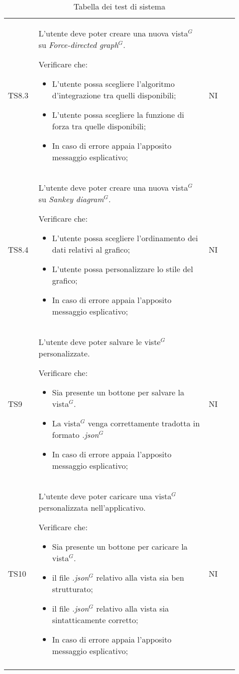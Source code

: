\begin{longtable}{p{0.12\linewidth}p{0.68\linewidth}p{0.12\linewidth}}
    \rowcolor[RGB]{233, 245, 206}
    TS8.3 &
    L'utente deve poter creare una nuova vista$^{G}$ su \textit{Force-directed graph}$^{G}$. \par
    Verificare che:
    \begin{itemize}
        \item L'utente possa scegliere l'algoritmo d'integrazione tra quelli disponibili;
        \item L'utente possa scegliere la funzione di forza tra quelle disponibili;
        \item In caso di errore appaia l’apposito messaggio esplicativo;
    \end{itemize}&
    NI \\

    \rowcolor[RGB]{216, 235, 171}
    TS8.4 &
    L'utente deve poter creare una nuova vista$^{G}$ su \textit{Sankey diagram}$^{G}$. \par
    Verificare che:
    \begin{itemize}
        \item L'utente possa scegliere l'ordinamento dei dati relativi al grafico;
        \item L'utente possa personalizzare lo stile del grafico;
        \item In caso di errore appaia l'apposito messaggio esplicativo;
    \end{itemize}&
    NI \\

    \rowcolor[RGB]{233, 245, 206}
    TS9 &
    L'utente deve poter salvare le viste$^{G}$ personalizzate. \par
    Verificare che:
    \begin{itemize}
        \item Sia presente un bottone per salvare la vista$^{G}$.
        \item La vista$^{G}$ venga correttamente tradotta in formato \textit{.json}$^{G}$
        \item In caso di errore appaia l'apposito messaggio esplicativo;
    \end{itemize}&
    NI \\

    \rowcolor[RGB]{216, 235, 171}
    TS10 &
    L'utente deve poter caricare una vista$^{G}$ personalizzata nell'applicativo. \par
    Verificare che:
    \begin{itemize}
        \item Sia presente un bottone per caricare la vista$^{G}$.
        \item il file \textit{.json}$^{G}$ relativo alla vista sia ben strutturato;
        \item il file \textit{.json}$^{G}$ relativo alla vista sia sintatticamente corretto;
        \item In caso di errore appaia l'apposito messaggio esplicativo;
    \end{itemize}&
    NI \\
    
    \caption{Tabella dei test di sistema}
\end{longtable}	 


